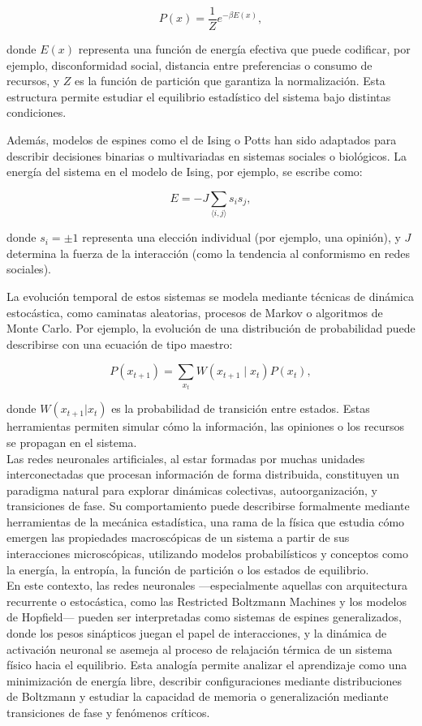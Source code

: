 \[
P(x) = \frac{1}{Z} e^{-\beta E(x)},
\]

donde $E(x)$ representa una función de energía efectiva que puede codificar, por ejemplo, disconformidad social, distancia entre preferencias o consumo de recursos, y $Z$ es la función de partición que garantiza la normalización. Esta estructura permite estudiar el equilibrio estadístico del sistema bajo distintas condiciones.

Además, modelos de espines como el de Ising o Potts han sido adaptados para describir decisiones binarias o multivariadas en sistemas sociales o biológicos. La energía del sistema en el modelo de Ising, por ejemplo, se escribe como:

\[
E = -J \sum_{\langle i,j \rangle} s_i s_j,
\]

donde  $s_i=\pm1$ representa una elección individual (por ejemplo, una opinión), y $J$ determina la fuerza de la interacción (como la tendencia al conformismo en redes sociales).

La evolución temporal de estos sistemas se modela mediante técnicas de dinámica estocástica, como caminatas aleatorias, procesos de Markov o algoritmos de Monte Carlo. Por ejemplo, la evolución de una distribución de probabilidad puede describirse con una ecuación de tipo maestro:

\[
P(x_{t+1}) = \sum_{x_t} W(x_{t+1} \mid x_t) P(x_t),
\]

donde $W(x_{t+1}|x_t)$ es la probabilidad de transición entre estados. Estas herramientas permiten simular cómo la información, las opiniones o los recursos se propagan en el sistema.\\

\cite{mitchell2009complexity}Las redes neuronales artificiales, al estar formadas por muchas unidades interconectadas que procesan información de forma distribuida, constituyen un paradigma natural para explorar dinámicas colectivas, autoorganización, y transiciones de fase. Su comportamiento puede describirse formalmente mediante herramientas de la mecánica estadística, una rama de la física que estudia cómo emergen las propiedades macroscópicas de un sistema a partir de sus interacciones microscópicas, utilizando modelos probabilísticos y conceptos como la energía, la entropía, la función de partición o los estados de equilibrio.\\

En este contexto, las redes neuronales —especialmente aquellas con arquitectura recurrente o estocástica, como las Restricted Boltzmann Machines y los modelos de Hopfield— pueden ser interpretadas como sistemas de espines generalizados, donde los pesos sinápticos juegan el papel de interacciones, y la dinámica de activación neuronal se asemeja al proceso de relajación térmica de un sistema físico hacia el equilibrio. Esta analogía permite analizar el aprendizaje como una minimización de energía libre, describir configuraciones mediante distribuciones de Boltzmann y estudiar la capacidad de memoria o generalización mediante transiciones de fase y fenómenos críticos.\\

